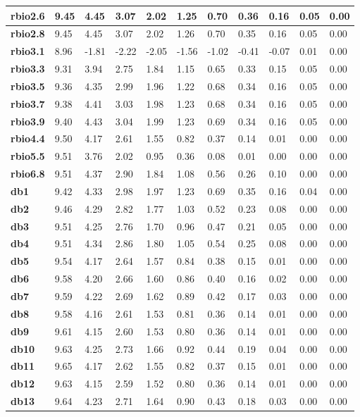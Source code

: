 \begin{tiny}
\begin{longtable}{|l|l|l|l|l|l|l|l|l|l|l|}
\textbf{rbio2.6}&9.45&4.45&3.07&2.02&1.25&0.70&0.36&0.16&0.05&0.00\\\hline
\textbf{rbio2.8}&9.45&4.45&3.07&2.02&1.26&0.70&0.35&0.16&0.05&0.00\\\hline
\textbf{rbio3.1}&8.96&-1.81&-2.22&-2.05&-1.56&-1.02&-0.41&-0.07&0.01&0.00\\\hline
\textbf{rbio3.3}&9.31&3.94&2.75&1.84&1.15&0.65&0.33&0.15&0.05&0.00\\\hline
\textbf{rbio3.5}&9.36&4.35&2.99&1.96&1.22&0.68&0.34&0.16&0.05&0.00\\\hline
\textbf{rbio3.7}&9.38&4.41&3.03&1.98&1.23&0.68&0.34&0.16&0.05&0.00\\\hline
\textbf{rbio3.9}&9.40&4.43&3.04&1.99&1.23&0.69&0.34&0.16&0.05&0.00\\\hline
\textbf{rbio4.4}&9.50&4.17&2.61&1.55&0.82&0.37&0.14&0.01&0.00&0.00\\\hline
\textbf{rbio5.5}&9.51&3.76&2.02&0.95&0.36&0.08&0.01&0.00&0.00&0.00\\\hline
\textbf{rbio6.8}&9.51&4.37&2.90&1.84&1.08&0.56&0.26&0.10&0.00&0.00\\\hline
\textbf{db1}&9.42&4.33&2.98&1.97&1.23&0.69&0.35&0.16&0.04&0.00\\\hline
\textbf{db2}&9.46&4.29&2.82&1.77&1.03&0.52&0.23&0.08&0.00&0.00\\\hline
\textbf{db3}&9.51&4.25&2.76&1.70&0.96&0.47&0.21&0.05&0.00&0.00\\\hline
\textbf{db4}&9.51&4.34&2.86&1.80&1.05&0.54&0.25&0.08&0.00&0.00\\\hline
\textbf{db5}&9.54&4.17&2.64&1.57&0.84&0.38&0.15&0.01&0.00&0.00\\\hline
\textbf{db6}&9.58&4.20&2.66&1.60&0.86&0.40&0.16&0.02&0.00&0.00\\\hline
\textbf{db7}&9.59&4.22&2.69&1.62&0.89&0.42&0.17&0.03&0.00&0.00\\\hline
\textbf{db8}&9.58&4.16&2.61&1.53&0.81&0.36&0.14&0.01&0.00&0.00\\\hline
\textbf{db9}&9.61&4.15&2.60&1.53&0.80&0.36&0.14&0.01&0.00&0.00\\\hline
\textbf{db10}&9.63&4.25&2.73&1.66&0.92&0.44&0.19&0.04&0.00&0.00\\\hline
\textbf{db11}&9.65&4.17&2.62&1.55&0.82&0.37&0.15&0.01&0.00&0.00\\\hline
\textbf{db12}&9.63&4.15&2.59&1.52&0.80&0.36&0.14&0.01&0.00&0.00\\\hline
\textbf{db13}&9.64&4.23&2.71&1.64&0.90&0.43&0.18&0.03&0.00&0.00\\\hline

\end{longtable}
\end{tiny}
